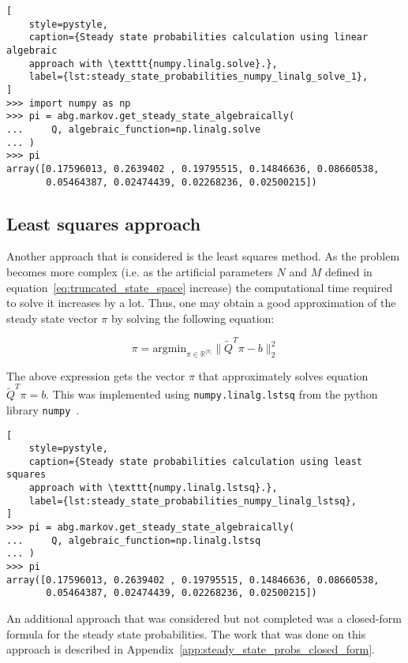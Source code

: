 \begin{lstlisting}[
    style=pystyle,
    caption={Steady state probabilities calculation using linear algebraic
    approach with \texttt{numpy.linalg.solve}.},
    label={lst:steady_state_probabilities_numpy_linalg_solve_1},
]
>>> import numpy as np
>>> pi = abg.markov.get_steady_state_algebraically(
...     Q, algebraic_function=np.linalg.solve
... )
>>> pi
array([0.17596013, 0.2639402 , 0.19795515, 0.14846636, 0.08660538,
       0.05464387, 0.02474439, 0.02268236, 0.02500215])

\end{lstlisting}


\subsection{Least squares approach}

Another approach that is considered is the least squares method.
As the problem becomes more complex (i.e. as the artificial parameters \(N\)
and \(M\) defined in equation~\eqref{eq:truncated_state_space} increase)
the computational time required to solve it increases by a lot.
Thus, one may obtain a good approximation of the steady state vector \( \pi \)
by solving the following equation:

\begin{equation}
    \pi = \text{argmin}_{\pi \in \mathbb{R}^{|\pi|}}\|\tilde Q^T \pi - b\|_2^2
\end{equation}

The above expression gets the vector \( \pi \) that approximately solves
equation \(\tilde Q^T \pi = b\).
This was implemented using \texttt{numpy.linalg.lstsq} from the python
library \texttt{numpy}~\cite{2020NumPy-Array}.

\begin{lstlisting}[
    style=pystyle,
    caption={Steady state probabilities calculation using least squares
    approach with \texttt{numpy.linalg.lstsq}.},
    label={lst:steady_state_probabilities_numpy_linalg_lstsq},
]
>>> pi = abg.markov.get_steady_state_algebraically(
...     Q, algebraic_function=np.linalg.lstsq
... )
>>> pi
array([0.17596013, 0.2639402 , 0.19795515, 0.14846636, 0.08660538,
       0.05464387, 0.02474439, 0.02268236, 0.02500215])

\end{lstlisting}


An additional approach that was considered but not completed was a
closed-form formula for the steady state probabilities.
The work that was done on this approach is described in
Appendix~\ref{app:steady_state_probs_closed_form}.

